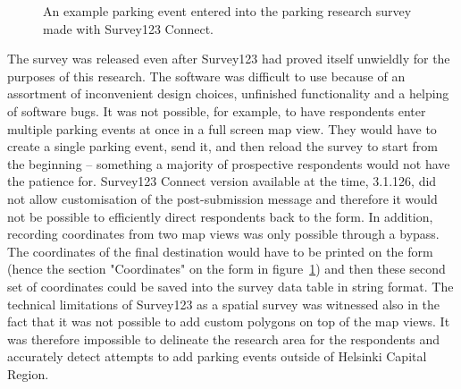 \begin{figure}[H]%
    \centering
    \quad
    \quad
    \caption[The unused parking survey created with Survey123]{An example parking event entered into the parking research survey made with Survey123 Connect.}%
    \label{fig:survey123}%
\end{figure}

The survey was released even after Survey123 had proved itself unwieldly for the purposes of this research. The software was difficult to use because of an assortment of inconvenient design choices, unfinished functionality and a helping of software bugs. It was not possible, for example, to have respondents enter multiple parking events at once in a full screen map view. They would have to create a single parking event, send it, and then reload the survey to start from the beginning -- something a majority of prospective respondents would not have the patience for. Survey123 Connect version available at the time, 3.1.126, did not allow customisation of the post-submission message and therefore it would not be possible to efficiently direct respondents back to the form. In addition, recording coordinates from two map views was only possible through a bypass. The coordinates of the final destination would have to be printed on the form (hence the section "Coordinates" on the form in figure~\ref{fig:survey123}) and then these second set of coordinates could be saved into the survey data table in string format. The technical limitations of Survey123 as a spatial survey was witnessed also in the fact that it was not possible to add custom polygons on top of the map views. It was therefore impossible to delineate the research area for the respondents and accurately detect attempts to add parking events outside of Helsinki Capital Region.

